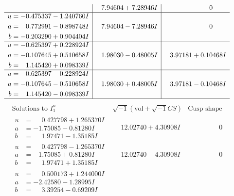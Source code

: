 \documentclass[1p]{elsarticle_modified}
\theoremstyle{definition}
\newcommand{\I}{\sqrt{-1}}
\begin{document}
$$\begin{array}{c|c|c}
 & \phantom{-}7.94604 + 7.28946 I & \phantom{-0.000000 } 0 \\ \hline\begin{aligned}
u &= -0.475337 - 1.240760 I \\
a &= \phantom{-}0.772991 - 0.898748 I \\
b &= -0.203290 + 0.904404 I\end{aligned}
 & \phantom{-}7.94604 - 7.28946 I & \phantom{-0.000000 } 0 \\ \hline\begin{aligned}
u &= -0.625397 + 0.228924 I \\
a &= -0.107645 + 0.510658 I \\
b &= \phantom{-}1.145420 + 0.098339 I\end{aligned}
 & \phantom{-}1.98030 - 0.48005 I & \phantom{-}3.97181 + 0.10468 I \\ \hline\begin{aligned}
u &= -0.625397 - 0.228924 I \\
a &= -0.107645 - 0.510658 I \\
b &= \phantom{-}1.145420 - 0.098339 I\end{aligned}
 & \phantom{-}1.98030 + 0.48005 I & \phantom{-}3.97181 - 0.10468 I\\
 \hline 
 \end{array}$$\newpage$$\begin{array}{c|c|c}  
\text{Solutions to }I^u_{1}& \I (\text{vol} + \sqrt{-1}CS) & \text{Cusp shape}\\
 \hline 
\begin{aligned}
u &= \phantom{-}0.427798 + 1.265370 I \\
a &= -1.75085 - 0.81280 I \\
b &= \phantom{-}1.97471 - 1.35185 I\end{aligned}
 & \phantom{-}12.02740 + 4.30908 I & \phantom{-0.000000 } 0 \\ \hline\begin{aligned}
u &= \phantom{-}0.427798 - 1.265370 I \\
a &= -1.75085 + 0.81280 I \\
b &= \phantom{-}1.97471 + 1.35185 I\end{aligned}
 & \phantom{-}12.02740 - 4.30908 I & \phantom{-0.000000 } 0 \\ \hline\begin{aligned}
u &= \phantom{-}0.500173 + 1.244000 I \\
a &= -2.42580 - 1.28995 I \\
b &= \phantom{-}3.39254 - 0.69209 I\end{aligned}

\end{array}$$
\end{document}
